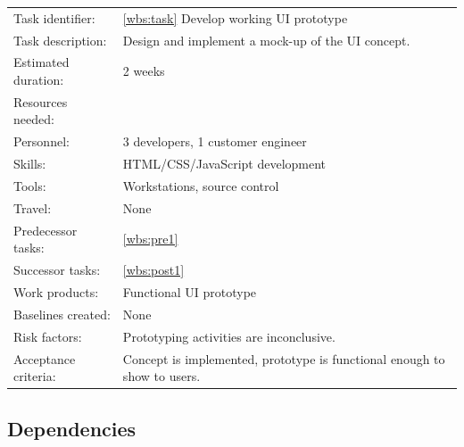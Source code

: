 \documentclass[11pt]{article}
\begin{document}
\begin{tabular*}{\textwidth}{l@{\hspace{1cm}}l}
  \hline
  Task identifier:        & \ref{wbs:task} Develop working UI prototype                              \\
  Task description:       & Design and implement a mock-up of the UI concept.                        \\
  Estimated duration:     & 2 weeks                                                                  \\
  Resources needed:       &                                                                          \\
  \hspace{1em} Personnel: & 3 developers, 1 customer engineer                                        \\
  \hspace{1em} Skills:    & HTML/CSS/JavaScript development                                          \\
  \hspace{1em} Tools:     & Workstations, source control                                             \\
  \hspace{1em} Travel:    & None                                                                     \\
  Predecessor tasks:      & \ref{wbs:pre1}                                                           \\
  Successor tasks:        & \ref{wbs:post1}                                                          \\
  Work products:          & Functional UI prototype                                                  \\
  Baselines created:      & None                                                                     \\
  Risk factors:           & Prototyping activities are inconclusive.                                 \\
  Acceptance criteria:    & Concept is implemented, prototype is functional enough to show to users. \\
  \hline
\end{tabular*}

\subsection{Dependencies}
\end{document}
